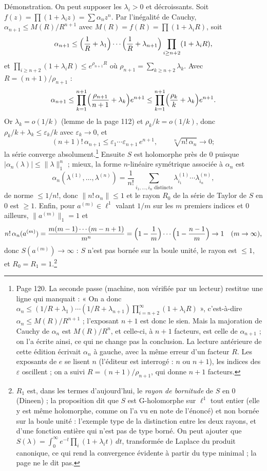 \documentclass[11pt,a4paper]{article}
\begin{document}
Démonstration. On peut supposer les $\lambda_i > 0$ et décroissants. Soit
$f(z) = \prod(1 + \lambda_i z) = \sum \alpha_n z^n$. Par l'inégalité de Cauchy,
$\alpha_{n+1} \leq M(R)/R^{n+1}$ avec $M(R) = f(R) = \prod(1 + \lambda_i R)$,
soit
\[
  \alpha_{n+1} \leq \Bigl(\frac1R + \lambda_1\Bigr)\cdots\Bigl(\frac1R + \lambda_{n+1}\Bigr)
  \prod_{i \geq n+2}(1 + \lambda_i R),
\]
et $\prod_{i \geq n+2}(1 + \lambda_i R) \leq e^{\rho_{n+1}R}$ où $\rho_{n+1} =
\sum_{k \geq n+2}\lambda_k$. Avec $R = (n+1)/\rho_{n+1}$ :
\[
  \alpha_{n+1} \leq \prod_{k=1}^{n+1}\Bigl(\frac{\rho_{n+1}}{n+1} + \lambda_k\Bigr) e^{n+1}
  \leq \prod_{k=1}^{n+1}\Bigl(\frac{\rho_k}{k} + \lambda_k\Bigr) e^{n+1} .
\]
Or $\lambda_k = o(1/k)$ (lemme de la page 112) et $\rho_k/k = o(1/k)$, donc
$\rho_k/k + \lambda_k \leq \varepsilon_k/k$ avec $\varepsilon_k \to 0$, et
\[
  (n+1)!\,\alpha_{n+1} \leq \varepsilon_1 \cdots \varepsilon_{n+1}\,e^{n+1},
  \qquad
  \sqrt[n]{n!\,\alpha_n} \to 0 ;
\]
la série converge absolument.\footnote{Page 120. La seconde passe (machine,
non vérifiée par un lecteur) restitue une ligne qui manquait : « On a donc
$\alpha_n \leq (1/R + \lambda_1) \cdots (1/R + \lambda_{n+1})
\prod_{i=n+2}^\infty (1 + \lambda_i R)$ », c'est-à-dire $\alpha_n \leq
M(R)/R^{n+1}$ ; l'exposant $n+1$ est donc le sien. Mais la majoration de
Cauchy de $\alpha_n$ est $M(R)/R^n$, et celle-ci, à $n+1$ facteurs, est celle
de $\alpha_{n+1}$ ; on l'a écrite ainsi, ce qui ne change pas la conclusion.
La lecture antérieure de cette édition écrivait $\alpha_n$ à gauche, avec la
même erreur d'un facteur $R$. Les exposants de $e$ se lisent $n$ (l'éditeur
est interrogé : $n$ ou $n+1$), les indices des $\varepsilon$ oscillent ; on a
suivi $R = (n+1)/\rho_{n+1}$, qui donne $n+1$ facteurs.} Ensuite $S$ est holomorphe près de $0$ puisque
$|\alpha_n(\lambda)| \leq \|\lambda\|_1^n$ ; mieux, la forme $n$-linéaire
symétrique associée à $\alpha_n$ est
\[
  \alpha_n(\lambda^{(1)}, \ldots, \lambda^{(n)}) = \frac{1}{n!}
  \sum_{i_1, \ldots, i_n \text{ distincts}} \lambda^{(1)}_{i_1} \cdots \lambda^{(n)}_{i_n},
\]
de norme $\leq 1/n!$, donc $\|n!\,\alpha_n\| \leq 1$ et le rayon $R_0$ de la
série de Taylor de $S$ en $0$ est $\geq 1$. Enfin, pour $a^{(m)} \in \ell^1$
valant $1/m$ sur les $m$ premiers indices et $0$ ailleurs, $\|a^{(m)}\|_1 = 1$
et
\[
  n!\,\alpha_n(a^{(m)}) = \frac{m(m-1)\cdots(m-n+1)}{m^n}
  = \Bigl(1 - \frac{1}{m}\Bigr)\cdots\Bigl(1 - \frac{n-1}{m}\Bigr) \to 1
  \quad (m \to \infty),
\]
donc $S(a^{(m)}) \to \infty$ : $S$ n'est pas bornée sur la boule unité, le
rayon est $\leq 1$, et $R_0 = R_1 = 1$.\footnote{$R_1$ est, dans les termes
d'aujourd'hui, le \emph{rayon de bornitude} de $S$ en $0$ (Dineen) ; la
proposition dit que $S$ est G-holomorphe sur $\ell^1$ tout entier (elle y
est même holomorphe, comme on l'a vu en note de l'énoncé) et non bornée
sur la boule unité : l'exemple type de la distinction entre les deux rayons,
et d'une fonction entière qui n'est pas de type borné. On peut
ajouter que $S(\lambda) = \int_0^\infty e^{-t}\prod_i(1 + \lambda_i t)\,dt$,
transformée de Laplace du produit canonique, ce qui rend la convergence
évidente à partir du type minimal ; la page ne le dit pas.}
\end{document}
